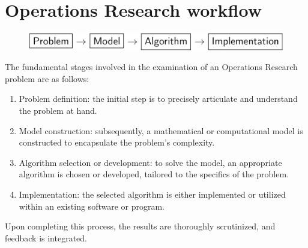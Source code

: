 \section{Operations Research workflow}

\begin{figure}[H]
    \centering
    \includegraphics[width=1\linewidth]{images/study.png}
\end{figure}
The fundamental stages involved in the examination of an Operations Research problem are as follows:
\begin{enumerate}
    \item Problem definition: the initial step is to precisely articulate and understand the problem at hand.
    \item Model construction: subsequently, a mathematical or computational model is constructed to encapsulate the problem's complexity.
    \item Algorithm selection or development: to solve the model, an appropriate algorithm is chosen or developed, tailored to the specifics of the problem.
    \item Implementation: the selected algorithm is either implemented or utilized within an existing software or program.
\end{enumerate}
Upon completing this process, the results are thoroughly scrutinized, and feedback is integrated.

